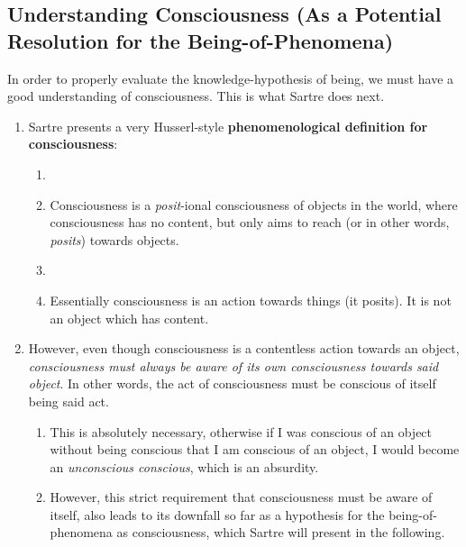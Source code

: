 \subsection{Understanding Consciousness (As a Potential Resolution for the Being-of-Phenomena)}
In order to properly evaluate the knowledge-hypothesis of being, we must have a good understanding of consciousness. This is what Sartre does next.

\begin{enumerate}
  \item Sartre presents a very Husserl-style \textbf{phenomenological definition for consciousness}:
  \begin{enumerate}
    \item {}
    \item Consciousness is a \emph{posit}-ional consciousness of objects in the world, where consciousness has no content, but only aims to reach (or in other words, \emph{posits}) towards objects.
    \item {}
    \item Essentially consciousness is an action towards things (it posits). It is not an object which has content.
  \end{enumerate}
  \item However, even though consciousness is a contentless action towards an object, \emph{consciousness must always be aware of its own consciousness towards said object}. In other words, the act of consciousness must be conscious of itself being said act.
  \begin{enumerate}
    \item This is absolutely necessary, otherwise if I was conscious of an object without being conscious that I am conscious of an object, I would become an \emph{unconscious conscious}, which is an absurdity.
    \item However, this strict requirement that consciousness must be aware of itself, also leads to its downfall so far as a hypothesis for the being-of-phenomena as consciousness, which Sartre will present in the following.
  \end{enumerate}
\end{enumerate}

